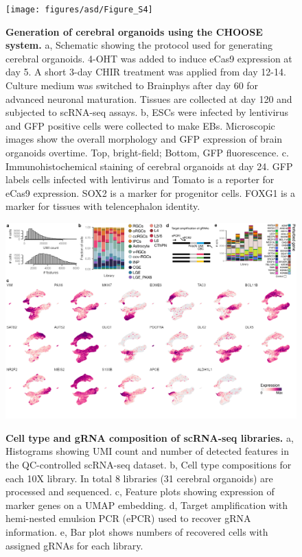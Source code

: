 \begin{figure}[h!]
    \centering
	\texttt{[image: figures/asd/Figure\_S4]}
    \label{fig:asdS4}
    \caption{\textbf{Generation of cerebral organoids using the CHOOSE system.} 
    a, Schematic showing the protocol used for generating cerebral organoids. 4-OHT was added to induce eCas9 expression at day 5. A short 3-day CHIR treatment was applied from day 12-14. Culture medium was switched to Brainphys after day 60 for advanced neuronal maturation. Tissues are collected at day 120 and subjected to scRNA-seq assays. b, ESCs were infected by lentivirus and GFP positive cells were collected to make EBs. Microscopic images show the overall morphology and GFP expression of brain organoids overtime. Top, bright-field; Bottom, GFP fluorescence. c. Immunohistochemical staining of cerebral organoids at day 24. GFP labels cells infected with lentivirus and Tomato is a reporter for eCas9 expression. SOX2 is a marker for progenitor cells. FOXG1 is a marker for tissues with telencephalon identity.}
\end{figure}



\begin{figure}[h!]
    \centering
	\includegraphics[width=\textwidth]{figures/asd/Figure_S5}
    \label{fig:asdS5}
    \caption{\textbf{Cell type and gRNA composition of scRNA-seq libraries.} 
    a, Histograms showing UMI count and number of detected features in the QC-controlled scRNA-seq dataset. b, Cell type compositions for each 10X library. In total 8 libraries (31 cerebral organoids) are processed and sequenced. c, Feature plots showing expression of marker genes on a UMAP embedding. d, Target amplification with hemi-nested emulsion PCR (ePCR) used to recover gRNA information. e, Bar plot shows numbers of recovered cells with assigned gRNAs for each library.}
\end{figure}



